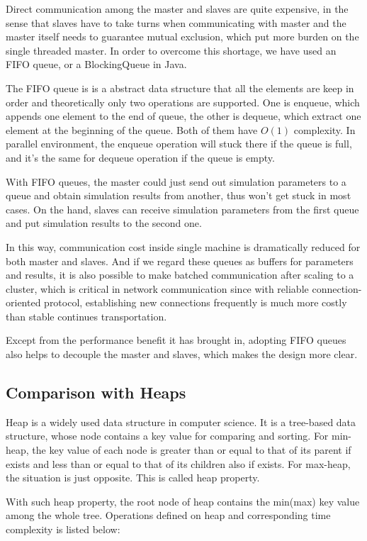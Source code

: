 \documentclass[12pt,a4]{report}
\begin{document}
Direct communication among the master and slaves are quite expensive, in the sense that slaves have to take turns when communicating with master and the master itself needs to guarantee mutual exclusion, which put more burden on the single threaded master. In order to overcome this shortage, we have used an FIFO queue, or a BlockingQueue in Java.

The FIFO queue is is a abstract data structure that all the elements are keep in order and theoretically only two operations are supported. One is enqueue, which appends one element to the end of queue, the other is dequeue, which extract one element at the beginning of the queue. Both of them have $O(1)$ complexity. In parallel environment, the enqueue operation will stuck there if the queue is full, and it's the same for dequeue operation if the queue is empty.

With FIFO queues, the master could just send out simulation parameters to a queue and obtain simulation results from another, thus won't get stuck in most cases. On the hand, slaves can receive simulation parameters from the first queue and put simulation results to the second one.

In this way, communication cost inside single machine is dramatically reduced for both master and slaves. And if we regard these queues as buffers for parameters and results, it is also possible to make batched communication after scaling to a cluster, which is critical in network communication since with reliable connection-oriented protocol, establishing new connections frequently is much more costly than stable continues transportation.

Except from the performance benefit it has brought in, adopting FIFO queues also helps to decouple the master and slaves, which makes the design more clear.

\subsection{Comparison with Heaps}

Heap is a widely used data structure in computer science. It is a tree-based data structure, whose node contains a key value for comparing and sorting. For min-heap, the key value of each node is greater than or equal to that of its parent if exists and less than or equal to that of its children also if exists. For max-heap, the situation is just opposite. This is called heap property.

With such heap property, the root node of heap contains the min(max) key value among the whole tree. Operations defined on heap and corresponding time complexity is listed below:
\end{document}
